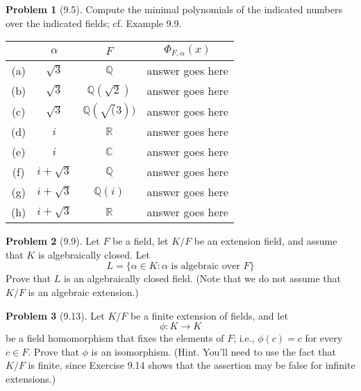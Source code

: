 \documentclass[12pt]{article}
\theoremstyle{definition}
\newtheorem{problem}{Problem}
\begin{document}
\begin{problem}[9.5]
    Compute the minimal polynomials of the indicated numbers over the indicated fields; cf. Example 9.9.

    \begin{center}
        \begin{tabular}{ |c|c|c|c| } 
         \hline
             & $\alpha$        & $F$                    & $\Phi_{F, \alpha}(x)$ \\ \hline
         (a) & $\sqrt{3}$      & $\mathbb{Q}$           & {answer goes here}    \\ \hline
         (b) & $\sqrt{3}$      & $\mathbb{Q}(\sqrt{2})$ & {answer goes here}    \\ \hline
         (c) & $\sqrt{3}$      & $\mathbb{Q}(\sqrt(3))$ & {answer goes here}    \\ \hline
         (d) & $i$             & $\mathbb{R}$           & {answer goes here}    \\ \hline
         (e) & $i$             & $\mathbb{C}$           & {answer goes here}    \\ \hline
         (f) & $i + \sqrt{3}$  & $\mathbb{Q}$           & {answer goes here}    \\ \hline
         (g) & $i + \sqrt{3}$  & $\mathbb{Q}(i)$        & {answer goes here}    \\ \hline
         (h) & $i + \sqrt{3}$  & $\mathbb{R}$           & {answer goes here}    \\ 
         \hline
        \end{tabular}
    \end{center}
    
\end{problem}

\begin{problem}[9.9]
    Let $F$ be a field, let $K/F$ be an extension field, and assume that $K$ is algebraically closed. Let
    \[
        L = \{ \alpha \in K : \alpha \text{ is algebraic over } F \}
    \]
    Prove that $L$ is an algebraically closed field. (Note that we do not assume that $K/F$ is an algebraic extension.)
    
    \begin{solution}

    \end{solution}
\end{problem}

\begin{problem}[9.13]
    Let $K/F$ be a finite extension of fields, and let
    \[
        \phi : K \longrightarrow K
    \]
    be a field homomorphism that fixes the elements of $F$; i.e., $\phi(c) = c$ for every $c \in F$. Prove that $\phi$ is an isomorphism. (Hint. You'll need to use the fact that $K/F$ is finite, since Exercise 9.14 shows that the assertion may be false for infinite extensions.)
    
    \begin{solution}

    \end{solution}
\end{problem}
\end{document}
